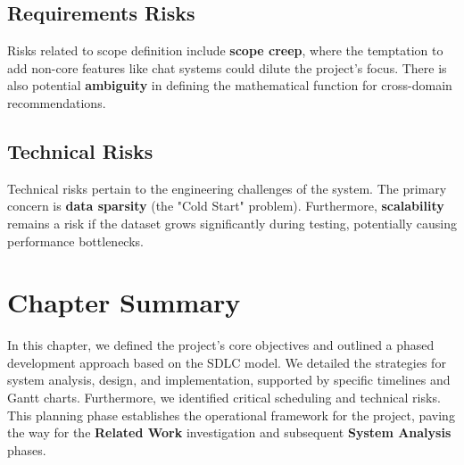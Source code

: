 \subsection{Requirements Risks}
\label{subsec:requirements_risks}
Risks related to scope definition include \textbf{scope creep}, where the temptation to add non-core features like chat systems could dilute the project's focus. There is also potential \textbf{ambiguity} in defining the mathematical function for cross-domain recommendations.

\subsection{Technical Risks}
\label{subsec:technical_risks}
Technical risks pertain to the engineering challenges of the system. The primary concern is \textbf{data sparsity} (the "Cold Start" problem). Furthermore, \textbf{scalability} remains a risk if the dataset grows significantly during testing, potentially causing performance bottlenecks.

\section{Chapter Summary}
\label{sec:planning_summary}
In this chapter, we defined the project's core objectives and outlined a phased development approach based on the SDLC model. We detailed the strategies for system analysis, design, and implementation, supported by specific timelines and Gantt charts. Furthermore, we identified critical scheduling and technical risks. This planning phase establishes the operational framework for the project, paving the way for the \textbf{Related Work} investigation and subsequent \textbf{System Analysis} phases.